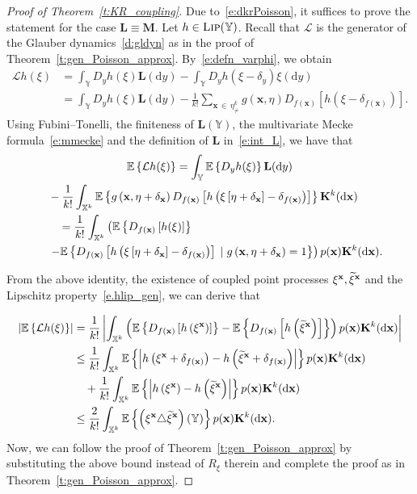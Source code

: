 \documentclass[10pt]{amsart}
\theoremstyle{definition}\newtheorem{defi}[theo]{Definition}\newtheorem{rema}[theo]{Remark}\newtheorem{exam}[theo]{Example}\newtheorem{exem}[theo]{Example}\newtheorem{nota}[theo]{Notation}
\newcommand*\bL{\mathbf{L}}
\newcommand*\bM{\mathbf{M}}
\newcommand*\bK{\mathbf{K}}
\newcommand{\bx}{\mathbf{x}}
\newcommand*\X{\mathbb{X}}
\newcommand*\Y{\mathbb{Y}}
\newcommand{\E}{\mathbb{E}}
\newcommand*\cL{\mathcal{L}}
\newcommand*\txi{\tilde{\xi}}
\newcommand*\cLip{\textsc{Lip}}
\newcommand*\md{\mathrm{d}}
\newcommand{\given}{\;|\;}
\newcommand{\mean}[1] {\E\left\{{#1}\right\}}
\newcommand{\cmean}[2] {\E\left\{#1\given #2\right\}}
\newcommand{\param}[1]{\left(#1\right)}
\newcommand{\abs}[1] {\left| {#1}\right|}
\let\oldtilde\tilde
\renewcommand*{\tilde}[1]{\mathchoice{\widetilde{#1}}{\widetilde{#1}}{\oldtilde{#1}}{\oldtilde{#1}}}
\begin{document}
\begin{proof}[Proof of Theorem~\ref{t:KR_coupling}]
Due to~\eqref{e:dkrPoisson}, it suffices to prove the statement for the case $\bL \equiv \bM$. Let $h\in\cLip(\Y)$. Recall that $\cL$ is the generator of the Glauber dynamics~\eqref{d:gldyn} as in the proof of Theorem~\ref{t:gen_Poisson_approx}. By~\eqref{e:defn_varphi}, we obtain
\begin{align*}
\cL h(\xi) & = \int_{\Y} D_y h(\xi) \bL(\md y) - \int_{\Y} D_yh\left(\xi - \delta_y\right) \xi(\md y) \\
& = \int_{\Y} D_y h(\xi) \bL(\md y) -  \frac{1}{k!} \sum_{\bx\,\in\,\eta_{\neq}^{k}} g(\bx,\eta)D_{f(\bx)}\left[h\left(\xi - \delta_{f(\bx)}\right)\right].
\end{align*}
Using Fubini--Tonelli, the finiteness of $\bL(\Y)$, the multivariate Mecke formula~\eqref{e:mmecke} and the definition of $\bL$ in~\eqref{e:int_L}, we have that
\begin{multline}\label{e:exp_lhphi}
\mean{\cL h(\xi)}
= \int_{\Y} \mean{D_yh(\xi)} \bL(\md y)\\
\begin{aligned}
&\quad- \frac{1}{k!}\int_{\X^k} \mean{g\left(\bx,\eta+ \delta_{\bx}\right)D_{f(\bx)}\left[h\left(\xi\left[\eta + \delta_{\bx}\right] - \delta_{f(\bx)}\right)\right]} \bK^k(\md \bx) \\
&\mkern35mu= \frac{1}{k!} \int_{\X^k} \param{\mean{D_{f(\bx)}\left[h(\xi)\right]}\right.\\
&\quad\left. - \cmean{D_{f(\bx)}\left[h\left(\xi\left[\eta + \delta_{\bx}\right] - \delta_{f(\bx)}\right)\right]}{g\left(\bx,\eta+ \delta_{\bx}\right) = 1}} p(\bx) \bK^k(\md \bx).
\end{aligned}
\end{multline}

From the above identity, the existence of coupled point processes $\xi^{\bx}, \txi^{\bx}$ and the Lipschitz property~\eqref{e.hlip_gen}, we can derive that

\begin{align*}
\left|\mean{\cL h(\xi)}\right| &= \frac{1}{k!}\abs{\int_{\X^k} \param{ \mean{D_{f(\bx)}\left[h\left(\xi^{\bx}\right)\right]} - \mean{D_{f(\bx)}\left[h\left(\txi^{\bx}\right)\right]}} p(\bx) \bK^k(\md \bx)} \\
& \leq \frac{1}{k!} \int_{\X^k} \mean{\abs{h\left(\xi^{\bx} + \delta_{f(\bx)}\right) - h\left(\txi^{\bx} + \delta_{f(\bx)}\right)}} p(\bx)\bK^k(\md \bx)\\
&\quad + \frac{1}{k!} \int_{\X^k} \mean{\abs{h\left(\xi^{\bx}\right) - h\left(\txi^{\bx}\right)}} p(\bx)\bK^k(\md \bx) \\
& \leq \frac{2}{k!} \int_{\X^k} \mean{\left(\xi^{\bx} \triangle \txi^{\bx}\right)(\Y)} p(\bx)\bK^k(\md \bx).
\end{align*}
Now, we can follow the proof of Theorem~\ref{t:gen_Poisson_approx} by substituting the above bound instead of $R_{\xi}$ therein and complete the proof as in Theorem~\ref{t:gen_Poisson_approx}.
\end{proof}
\end{document}
